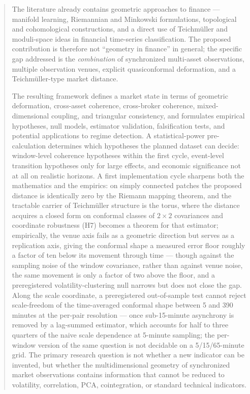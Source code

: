 \documentclass[11pt,a4paper]{article}
\numberwithin{equation}{section}
\begin{document}
\begin{abstract}
The literature already contains geometric approaches to finance ---
manifold learning, Riemannian and Minkowski formulations,
topological and cohomological constructions, and a direct use of
Teichmüller and moduli-space ideas in financial time-series
classification. The proposed contribution is therefore not
``geometry in finance'' in general; the specific gap addressed is
the \emph{combination} of synchronized multi-asset observations,
multiple observation venues, explicit quasiconformal deformation,
and a Teichmüller-type market distance.

The resulting framework defines a market state in terms of
geometric deformation, cross-asset coherence, cross-broker
coherence, mixed-dimensional coupling, and triangular consistency,
and formulates empirical hypotheses, null models, estimator
validation, falsification tests, and potential applications to
regime detection. A statistical-power pre-calculation determines
which hypotheses the planned dataset can decide: window-level
coherence hypotheses within the first cycle, event-level transition
hypotheses only for large effects, and economic significance not at
all on realistic horizons. A first implementation cycle sharpens
both the mathematics and the empirics: on simply connected patches
the proposed distance is identically zero by the Riemann mapping
theorem, and the tractable carrier of Teichmüller structure is the
torus, where the distance acquires a closed form on conformal
classes of $2\times2$ covariances and coordinate robustness (H7)
becomes a theorem for that estimator; empirically, the venue axis
fails as a geometric direction but serves as a replication axis,
giving the conformal shape a measured error floor roughly a factor
of ten below its movement through time --- though against the
sampling noise of the window covariance, rather than against venue
noise, the same movement is only a factor of two above the floor,
and a preregistered volatility-clustering null narrows but does not
close the gap. Along the scale coordinate, a preregistered
out-of-sample test cannot reject scale-freedom of the time-averaged
conformal shape between 5 and 390 minutes at the per-pair resolution
--- once sub-15-minute asynchrony is removed by a
lag-summed estimator, which accounts for half to three quarters of
the naive scale dependence at 5-minute sampling; the per-window
version of the same question is not decidable on a
5/15/65-minute grid. The primary research question is not whether a
new indicator can be invented, but whether the multidimensional
geometry of synchronized market observations contains information
that cannot be reduced to volatility, correlation, PCA,
cointegration, or standard technical indicators.
\end{abstract}
\end{document}
